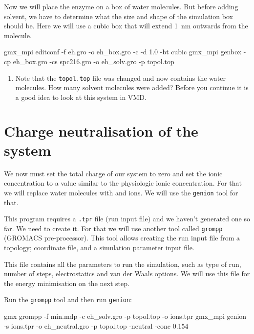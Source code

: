 \documentclass[10pt]{article}
\begin{document}
Now we will place the enzyme on a box of water molecules. But before adding solvent, we have to determine what the size and shape of the simulation box should be. Here we will use a cubic box that will extend 1~nm outwards from the molecule.

\begin{cmdline}
gmx_mpi editconf -f eh.gro -o eh_box.gro -c -d 1.0 -bt cubic
gmx_mpi genbox -cp eh_box.gro -cs spc216.gro -o eh_solv.gro -p topol.top
\end{cmdline}

\vspace{-0.3cm}

\begin{question} 
    \begin{enumerate}[leftmargin=0.6cm]
        \renewcommand{\labelenumi}{Q\arabic{enumi}.}
        \setcounter{enumi}{6}
        \item Note that the \texttt{topol.top} file was changed and now contains the water molecules. How many solvent molecules were added? Before you continue it is a good idea to look at this system in VMD. 
    \end{enumerate}
\end{question}


\section{Charge neutralisation of the system}

We now must set the total charge of our system to zero and set the ionic concentration to a value similar to the physiologic ionic concentration. For that we will replace water molecules with  and  ions. We will use the \texttt{genion} tool for that. 

This program requires a \texttt{.tpr} file (run input file) and we haven't generated one so far. We need to create it. For that we will use another tool called \texttt{grompp} (GROMACS pre-processor). This tool allows creating the run input file from a topology; coordinate file, and a simulation parameter input file. 

This file contains all the parameters to run the simulation, such as type of run, number of steps, electrostatics and van der Waals options. We will use this file for the energy minimisation on the next step. 

Run the \texttt{grompp} tool and then run \texttt{genion}:
\begin{cmdline}
gmx grompp -f min.mdp -c eh_solv.gro -p topol.top -o ions.tpr
gmx_mpi genion -s ions.tpr -o eh_neutral.gro -p topol.top -neutral -conc 0.154 
\end{cmdline}
\end{document}
